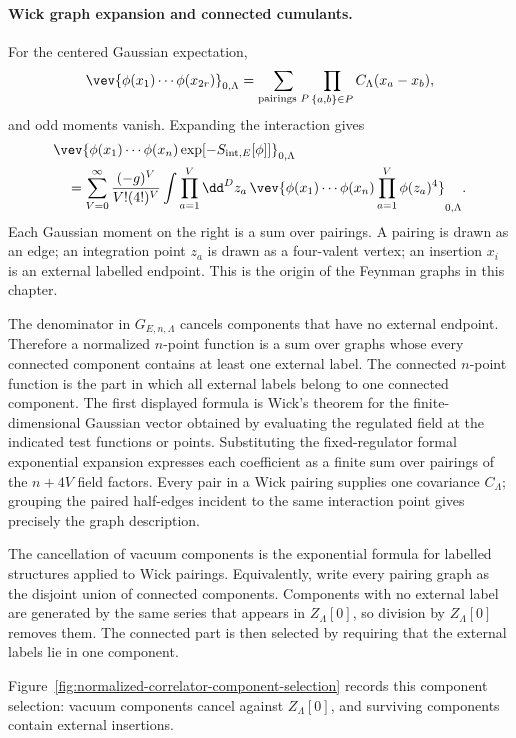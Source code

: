 \paragraph{Wick graph expansion and connected cumulants.}
For the centered Gaussian expectation,
\[
  \vev{\phi(x_1)\cdots\phi(x_{2r})}_{0,\Lambda}
  =
  \sum_{\text{pairings }P}
  \prod_{\{a,b\}\in P} C_\Lambda(x_a-x_b),
\]
and odd moments vanish. Expanding the interaction gives
\[
\begin{aligned}
  &\vev{
    \phi(x_1)\cdots\phi(x_n)
    \exp[-S_{\mathrm{int},E}[\phi]]
  }_{0,\Lambda}
  \\
  &\quad =
  \sum_{V=0}^\infty
  \frac{(-g)^V}{V!(4!)^V}
  \int \prod_{a=1}^V \dd^D z_a\,
  \vev{
    \phi(x_1)\cdots\phi(x_n)
    \prod_{a=1}^V \phi(z_a)^4
  }_{0,\Lambda}.
\end{aligned}
\]
Each Gaussian moment on the right is a sum over pairings. A pairing is drawn
as an edge; an integration point \(z_a\) is drawn as a four-valent vertex; an
insertion \(x_i\) is an external labelled endpoint. This is the origin of the
Feynman graphs in this chapter.

The denominator in \(G_{E,n,\Lambda}\) cancels components that have no
external endpoint. Therefore a normalized \(n\)-point function is a sum over
graphs whose every connected component contains at least one external label.
The connected \(n\)-point function is the part in which all external labels
belong to one connected component.
The first displayed formula is Wick's theorem for the finite-dimensional
Gaussian vector obtained by evaluating the regulated field at the indicated
test functions or points.  Substituting the fixed-regulator formal
exponential expansion expresses each coefficient as a finite sum over pairings
of the \(n+4V\) field factors.
Every pair in a Wick pairing supplies one covariance \(C_\Lambda\); grouping
the paired half-edges incident to the same interaction point gives precisely
the graph description.

The cancellation of vacuum components is the exponential formula for labelled
structures applied to Wick pairings.  Equivalently, write every pairing graph
as the disjoint union of connected components.  Components with no external
label are generated by the same series that appears in
\(Z_\Lambda[0]\), so division by \(Z_\Lambda[0]\) removes them.  The connected
part is then selected by requiring that the external labels lie in one
component.

Figure~\ref{fig:normalized-correlator-component-selection} records this component
selection: vacuum components cancel against \(Z_\Lambda[0]\), and surviving
components contain external insertions.

